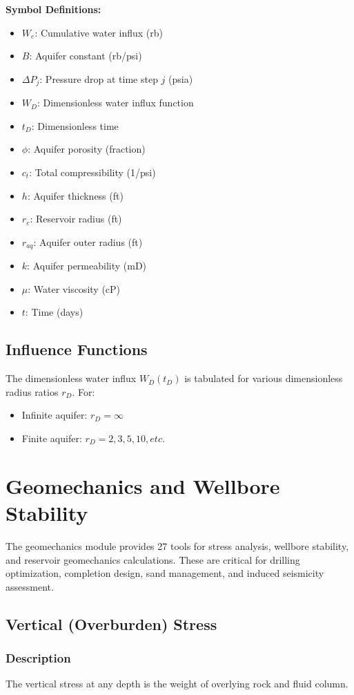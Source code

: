 \documentclass[11pt,a4paper]{article}
\newcommand{\symitem}[2]{\item \textbf{#1}: #2}
\begin{document}
\textbf{Symbol Definitions:}
\begin{itemize}[leftmargin=2cm]
\symitem{$W_e$}{Cumulative water influx (rb)}
\symitem{$B$}{Aquifer constant (rb/psi)}
\symitem{$\Delta P_j$}{Pressure drop at time step $j$ (psia)}
\symitem{$W_D$}{Dimensionless water influx function}
\symitem{$t_D$}{Dimensionless time}
\symitem{$\phi$}{Aquifer porosity (fraction)}
\symitem{$c_t$}{Total compressibility (1/psi)}
\symitem{$h$}{Aquifer thickness (ft)}
\symitem{$r_e$}{Reservoir radius (ft)}
\symitem{$r_{aq}$}{Aquifer outer radius (ft)}
\symitem{$k$}{Aquifer permeability (mD)}
\symitem{$\mu$}{Water viscosity (cP)}
\symitem{$t$}{Time (days)}
\end{itemize}

\subsection{Influence Functions}

The dimensionless water influx $W_D(t_D)$ is tabulated for various dimensionless radius ratios $r_D$. For:
\begin{itemize}
\item Infinite aquifer: $r_D = \infty$
\item Finite aquifer: $r_D = 2, 3, 5, 10, etc.$
\end{itemize}

\newpage

\section{Geomechanics and Wellbore Stability}

The geomechanics module provides 27 tools for stress analysis, wellbore stability, and reservoir geomechanics calculations. These are critical for drilling optimization, completion design, sand management, and induced seismicity assessment.

\subsection{Vertical (Overburden) Stress}

\subsubsection{Description}
The vertical stress at any depth is the weight of overlying rock and fluid column.
\end{document}
